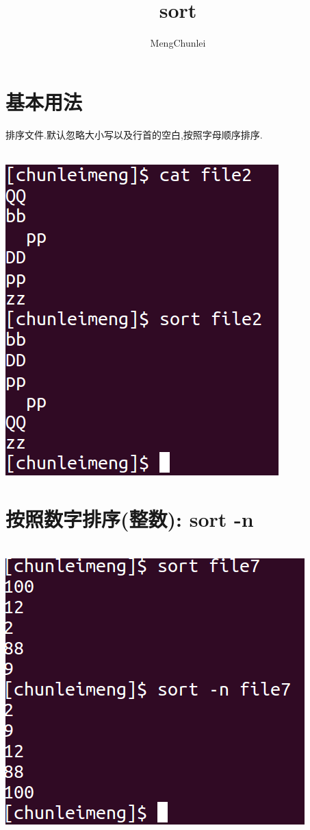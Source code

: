 \documentclass{article}
\title{sort}
\author{MengChunlei}
\begin{document}
\maketitle
\section{基本用法}
排序文件.默认忽略大小写以及行首的空白,按照字母顺序排序. \par
~\\
\includegraphics[scale=0.4]{pic1.png} \par

\section{按照数字排序(整数): sort -n}
~\\
\includegraphics[scale=0.4]{pic2.png} \par
\end{document}
